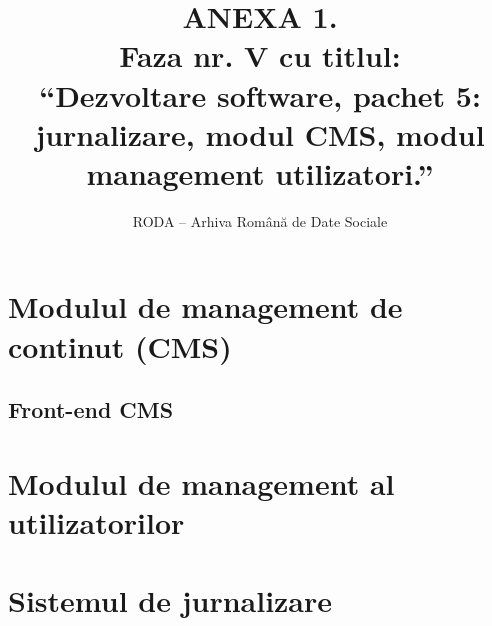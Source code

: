 \documentclass[11pt,twoside,romanian]{extbook}
\begin{document}
\fancyhead[RE,LO]{\thepage}


\title{ANEXA 1.\\
Faza nr. V 
cu titlul:\\
``Dezvoltare software, pachet 5: jurnalizare, modul CMS, modul management utilizatori.''
}

\author{RODA -- Arhiva Rom\^{a}n\u{a} de Date Sociale}

\date{ }

\maketitle

\newpage
\thispagestyle{plain}
\tableofcontents{}
\setcounter{page}{1}

\chapter{Modulul de management de continut (CMS)}

\section{Front-end CMS}











 



\chapter{Modulul de management al utilizatorilor}


\chapter{Sistemul de jurnalizare}




\end{document}
